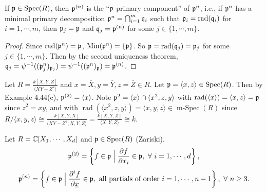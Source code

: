 \begin{proposition}
    If $\mathfrak{p} \in \operatorname{Spec}(R)$, then $\mathfrak{p}^{(n)}$ is the ``$\mathfrak{p}$-primary component'' of $\mathfrak{p}^{n}$, i.e., if $\mathfrak{p}^{n}$ has a minimal primary decomposition $\mathfrak{p}^{n} = \bigcap_{i=1}^{m} \mathfrak{q}_i$ such that $\mathfrak{p}_i = \operatorname{rad}(\mathfrak{q}_i)$ for $i = 1,\cdots,m$, then $\mathfrak{p}_j = \mathfrak{p}$ and $\mathfrak{q}_j = \mathfrak{p}^{(n)}$ for some $j \in \{1,\cdots,m\}$. 
\end{proposition}

\begin{proof}
    Since $\operatorname{rad}(\mathfrak{p}^{n}) = \mathfrak{p}$, $\operatorname{Min}(\mathfrak{p}^{n}) = \{\mathfrak{p}\}$. So $\mathfrak{p} = \operatorname{rad}(\mathfrak{q}_j) = \mathfrak{p}_j$ for some $j \in \{1,\cdots,m\}$. Then by the second uniqueness theorem, $\mathfrak{q}_j = \psi^{-1}((\mathfrak{p}_j^{n})_{\mathfrak{p}_j}) = \psi^{-1}((\mathfrak{p}^{n})_{\mathfrak{p}}) = \mathfrak{p}^{(n)}$.
\end{proof}

\begin{example}
    Let $R = \frac{k[X,Y,Z]}{\langle XY-Z^{2} \rangle}$ and $x = \overbar{X}, y = \overbar{Y}, z = \overbar{Z} \in R$. Let $\mathfrak{p} = \langle x,z \rangle \in \operatorname{Spec}(R)$. Then by Example 4.44(c), $\mathfrak{p}^{(2)} = \langle x \rangle$. Note $\mathfrak{p}^{2} = \langle x \rangle \cap \langle x^{2},z,y \rangle$ with $\operatorname{rad}(\langle x \rangle) = \langle x,z \rangle = \mathfrak{p}$ since $z^{2} = xy$, and with $\operatorname{rad}(\langle x^{2},z,y \rangle) = \langle x,y,z \rangle \in \operatorname{m-Spec}(R)$ since $R/\langle x,y,z \rangle \cong \frac{k[X,Y,X]}{\langle XY-Z^{2},X,Y,Z \rangle} = \frac{k[X,Y,Z]}{\langle X,Y,Z \rangle} \cong k$.
\end{example}

\begin{definition}
    Let $R = \mathbb{C}[X_1,\cdots,X_d]$ and $\mathfrak{p} \in \operatorname{Spec}(R)$ (Zariski). 
    \[\mathfrak{p}^{(2)} = \left\{f \in \mathfrak{p} \mathrel{\Big |} \frac{\partial f}{ \partial x_i} \in \mathfrak{p},\ \forall \  i = 1,\cdots,d\right\},\] 
    \[\mathfrak{p}^{(n)} = \left\{f \in \mathfrak{p} \mathrel{\Big |} \frac{\partial^{i} f}{\partial \underline x} \in \mathfrak{p}, \text{ all partials of order } i = 1,\cdots,n-1\right\},\ \forall \  n \geq 3.\]
\end{definition}

